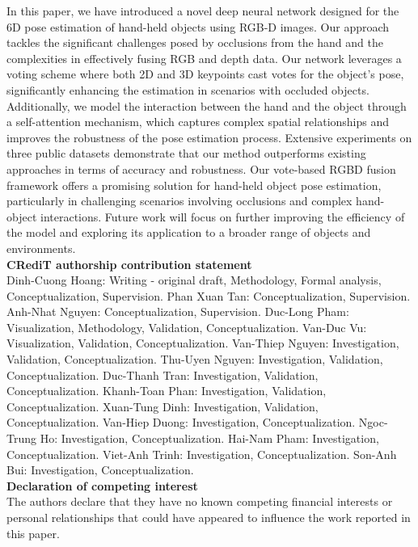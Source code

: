 In this paper, we have introduced a novel deep neural network designed for the 6D pose estimation of hand-held objects using RGB-D images. Our approach tackles the significant challenges posed by occlusions from the hand and the complexities in effectively fusing RGB and depth data.  Our network leverages a voting scheme where both 2D and 3D keypoints cast votes for the object's pose, significantly enhancing the estimation in scenarios with occluded objects. Additionally, we model the interaction between the hand and the object through a self-attention mechanism, which captures complex spatial relationships and improves the robustness of the pose estimation process. Extensive experiments on three public datasets demonstrate that our method outperforms existing approaches in terms of accuracy and robustness. Our vote-based RGBD fusion framework offers a promising solution for hand-held object pose estimation, particularly in challenging scenarios involving occlusions and complex hand-object interactions. Future work will focus on further improving the efficiency of the model and exploring its application to a broader range of objects and environments. \\

\textbf{CRediT authorship contribution statement} \\

Dinh-Cuong Hoang: Writing - original draft, Methodology, Formal analysis, Conceptualization, Supervision. Phan Xuan Tan: Conceptualization, Supervision. Anh-Nhat Nguyen: Conceptualization, Supervision. Duc-Long Pham: Visualization, Methodology, Validation, Conceptualization. Van-Duc Vu: Visualization, Validation, Conceptualization. Van-Thiep Nguyen:  Investigation, Validation, Conceptualization. Thu-Uyen Nguyen: Investigation, Validation, Conceptualization. Duc-Thanh Tran: Investigation, Validation, Conceptualization.  Khanh-Toan Phan: Investigation, Validation, Conceptualization. Xuan-Tung Dinh: Investigation, Validation, Conceptualization. Van-Hiep Duong: Investigation, Conceptualization. Ngoc-Trung Ho: Investigation, Conceptualization. Hai-Nam Pham: Investigation, Conceptualization. Viet-Anh Trinh: Investigation, Conceptualization. Son-Anh Bui: Investigation, Conceptualization. \\ 

\textbf{Declaration of competing interest} \\

The authors declare that they have no known competing financial interests or personal relationships that could have appeared to influence the work reported in this paper.